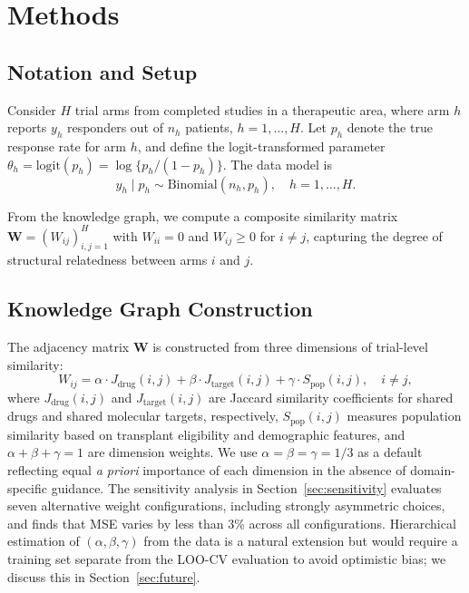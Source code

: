 \documentclass[12pt]{article}
\newcommand{\bW}{\mathbf{W}}
\begin{document}
\section{Methods}
\label{sec:methods}

\subsection{Notation and Setup}
\label{sec:notation}

Consider $H$ trial arms from completed studies in a therapeutic area, where arm $h$ reports $y_h$ responders out of $n_h$ patients, $h = 1, \ldots, H$. Let $p_h$ denote the true response rate for arm $h$, and define the logit-transformed parameter $\theta_h = \text{logit}(p_h) = \log\{p_h / (1 - p_h)\}$. The data model is
\begin{equation}
\label{eq:data_model}
y_h \mid p_h \sim \text{Binomial}(n_h, p_h), \quad h = 1, \ldots, H.
\end{equation}

From the knowledge graph, we compute a composite similarity matrix $\bW = (W_{ij})_{i,j=1}^{H}$ with $W_{ii} = 0$ and $W_{ij} \geq 0$ for $i \neq j$, capturing the degree of structural relatedness between arms $i$ and $j$.

\subsection{Knowledge Graph Construction}
\label{sec:kg_construction}

The adjacency matrix $\bW$ is constructed from three dimensions of trial-level similarity:
\begin{equation}
\label{eq:similarity}
W_{ij} = \alpha \cdot J_{\text{drug}}(i,j) + \beta \cdot J_{\text{target}}(i,j) + \gamma \cdot S_{\text{pop}}(i,j), \quad i \neq j,
\end{equation}
where $J_{\text{drug}}(i,j)$ and $J_{\text{target}}(i,j)$ are Jaccard similarity coefficients for shared drugs and shared molecular targets, respectively, $S_{\text{pop}}(i,j)$ measures population similarity based on transplant eligibility and demographic features, and $\alpha + \beta + \gamma = 1$ are dimension weights. We use $\alpha = \beta = \gamma = 1/3$ as a default reflecting equal \emph{a priori} importance of each dimension in the absence of domain-specific guidance. The sensitivity analysis in Section~\ref{sec:sensitivity} evaluates seven alternative weight configurations, including strongly asymmetric choices, and finds that MSE varies by less than 3\% across all configurations. Hierarchical estimation of $(\alpha, \beta, \gamma)$ from the data is a natural extension but would require a training set separate from the LOO-CV evaluation to avoid optimistic bias; we discuss this in Section~\ref{sec:future}.
\end{document}

